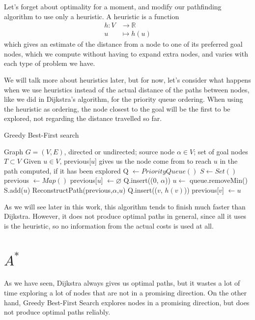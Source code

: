 \documentclass[a4paper,10pt]{report}
\begin{document}
Let's forget about optimality for a moment, and modify our pathfinding algorithm to use only a heuristic. A heuristic is a function
\begin{align*}
	h \colon V &\to \mathbb{R}\\
	u &\mapsto h(u)
\end{align*}
which gives an estimate of the distance from a node to one of its preferred goal nodes, which we compute without having to expand extra nodes, and varies with each type of problem we have.

We will talk more about heuristics later, but for now, let's consider what happens when we use heuristics instead of the actual distance of the paths between nodes, like we did in Dijkstra's algorithm, for the priority queue ordering. When using the heuristic as ordering, the node closest to the goal will be the first to be explored, not regarding the distance travelled so far.

\begin{algorithm}
\caption{Greedy Best-First search}
\label{alg:greedy}
\begin{algorithmic}[1]
\Require Graph $G = (V, E)$, directed or undirected; source node $\alpha \in V$; set of goal nodes $T \subset V$
\Ensure Given $u \in V$, previous[$u$] gives us the node come from to reach $u$ in the path computed, if it has been explored
\State Q $\gets PriorityQueue()$
\State $S \gets Set()$
\State previous $\gets Map()$
	\State previous[$u$] $\gets \varnothing$
\EndFor
\State Q.insert((0, $\alpha$))
	\State $u \gets$ queue.removeMin()
	\State S.add($u$)
	 
		\State \Return ReconstructPath(previous,$\alpha$,$u$)
	\EndIf
			\Continue
		\EndIf
		\State Q.insert(($v$, $h(v)$))
		\State previous[$v$] $\gets u$
	\EndFor
\EndWhile
\EndProcedure
\end{algorithmic}
\end{algorithm}

As we will see later in this work, this algorithm tends to finish much faster than Dijkstra. However, it does not produce optimal paths in general, since all it uses is the heuristic, so no information from the actual costs is used at all.

\section{$A^*$}
\label{section:astar}
As we have seen, Dijkstra always gives us optimal paths, but it wastes a lot of time exploring a lot of nodes that are not in a promising direction. On the other hand, Greedy Best-First Search explores nodes in a promising direction, but does not produce optimal paths reliably.
\end{document}
